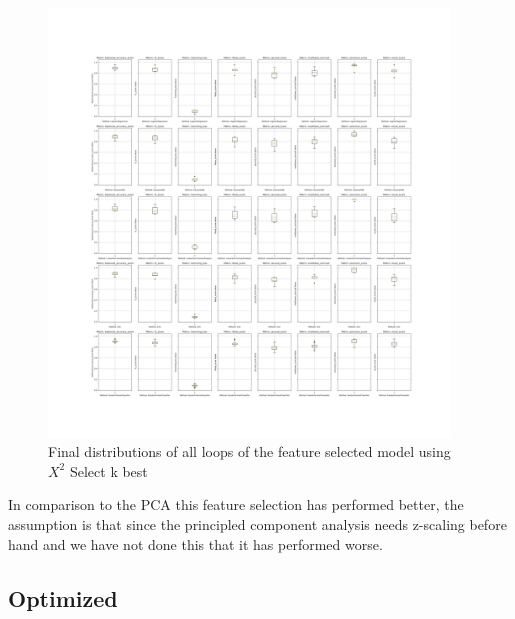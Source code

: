 \documentclass[12pt, a4paper]{article}
\begin{document}
\begin{figure}[H]
    \begin{center}
        \includegraphics[width=0.95\textwidth]{figures/RNCV/Bonus/All loop outer folds boxplots.png}
        \caption{Final distributions of all loops of the feature selected model using $X^2$ Select k best}\label{fig:bonus}
    \end{center}
\end{figure}

\begin{multicols}{2}

    In comparison to the PCA this feature selection has performed better, the assumption is that since the principled component analysis needs z-scaling before hand and we have not done this that it has performed worse.
    \newline

    \subsection{Optimized} \label{subsec:opted model}

\end{multicols}
\end{document}
